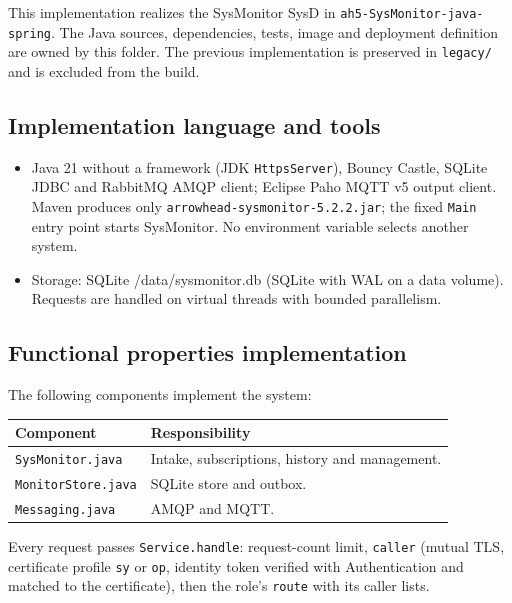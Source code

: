 \documentclass[a4paper]{arrowhead}
\begin{document}
This implementation realizes the SysMonitor SysD in \texttt{ah5-\allowbreak{}SysMonitor-\allowbreak{}java-\allowbreak{}spring}. The Java sources, dependencies, tests, image and deployment definition are owned by this folder. The previous implementation is preserved in \texttt{legacy/\allowbreak{}} and is excluded from the build.

\subsection{Implementation language and tools}
\begin{itemize}
\item Java 21 without a framework (JDK \texttt{HttpsServer}), Bouncy Castle, SQLite JDBC and RabbitMQ AMQP client; Eclipse Paho MQTT v5 output client. Maven produces only \texttt{arrowhead-\allowbreak{}sysmonitor-\allowbreak{}5.2.2.jar}; the fixed \texttt{Main} entry point starts SysMonitor. No environment variable selects another system.
\item Storage: SQLite /data/sysmonitor.db (SQLite with WAL on a data volume). Requests are handled on virtual threads with bounded parallelism.
\end{itemize}

\subsection{Functional properties implementation}

The following components implement the system:

\noindent\begin{longtable}{| p{5.6cm} | p{9.6cm} |} \hline
\rowcolor{gray!33} Component & Responsibility \\ \hline \endhead
\texttt{SysMonitor.\allowbreak{}java} & Intake, subscriptions, history and management. \\ \hline
\texttt{MonitorStore.\allowbreak{}java} & SQLite store and outbox. \\ \hline
\texttt{Messaging.\allowbreak{}java} & AMQP and MQTT. \\ \hline
\end{longtable}

Every request passes \texttt{Service.\allowbreak{}handle}: request-count limit, \texttt{caller} (mutual TLS, certificate profile \texttt{sy} or \texttt{op}, identity token verified with Authentication and matched to the certificate), then the role's \texttt{route} with its caller lists.
\end{document}
